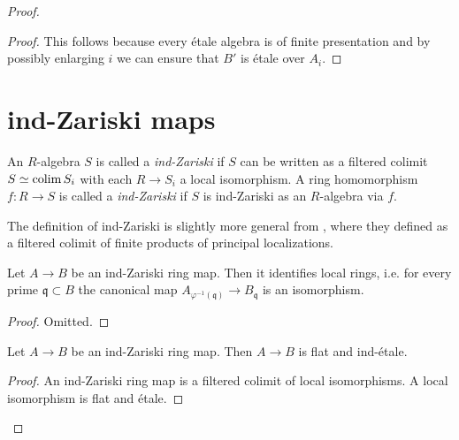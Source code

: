 \begin{proof}
\begin{proof}
    This follows because every étale algebra is of finite presentation and by possibly enlarging $i$ we can ensure
    that $B'$ is étale over $A_i$.
\end{proof}

\section{ind-Zariski maps}

\begin{definition}
    \label{def:ind-Zariski}
    An $R$-algebra $S$ is called a \emph{ind-Zariski} if $S$ can be written as a filtered colimit $S \simeq \operatorname{colim} S_i$ with each $R \to S_i$ a local isomorphism. A ring homomorphism $f : R \to S$ is called a \emph{ind-Zariski} if $S$ is ind-Zariski as an $R$-algebra via $f$.
\end{definition}

\begin{remark}
  The definition of ind-Zariski is slightly more general from \cite[Definition 2.2.1(iv)]{proetale}, where they defined as a filtered colimit of finite products of principal localizations.
\end{remark}

\begin{lemma}
  Let $A \to B$ be an ind-Zariski ring map. Then it identifies local rings, i.e. for every prime $\mathfrak{q} \subset B$ the canonical map $A_{\varphi^{-1}(\mathfrak{q})} \to B_{\mathfrak{q}}$ is an isomorphism.
  \label{thm:ind-Zariski-identifies-local-rings}
\end{lemma}

\begin{proof}
  Omitted.
\end{proof}

\begin{lemma}
  Let $A \to B$ be an ind-Zariski ring map. Then $A \to B$ is flat and ind-étale.
  \label{thm:ind-Zariski-is-flat-ind-etale}
\end{lemma}

\begin{proof}
  An ind-Zariski ring map is a filtered colimit of local isomorphisms. A local isomorphism is flat and étale.
\end{proof}


\end{proof}
